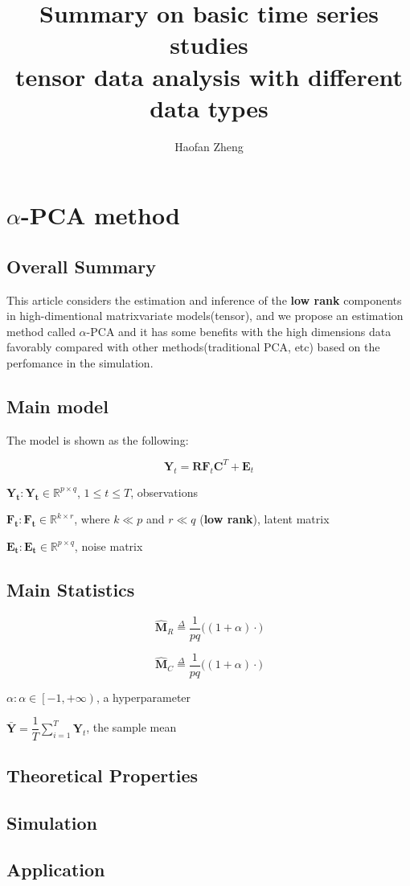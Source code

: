 \documentclass{article}[12pt]
\title{\textbf{Summary on basic time series studies\\ \large tensor data analysis with different data types}}
\author{Haofan Zheng}
\date{}
\begin{document}
\maketitle
\newpage
\tableofcontents
\newpage

\section{$\alpha$-PCA method}
\subsection{Overall Summary}
This article considers the estimation and inference of the \textbf{low rank} components in high-dimentional matrixvariate models(tensor), and we propose an estimation method called $\alpha$-PCA and it has some benefits with the high dimensions data favorably compared with other methods(traditional PCA, etc) based on the perfomance in the simulation.



\subsection{Main model}
The model is shown as the following:

$$\mathbf{Y}_t = \mathbf{R}\mathbf{F}_t\mathbf{C}^T+\mathbf{E}_t$$

$\mathbf{Y_t}: \mathbf{Y_t}\in \mathbb{R}^{p\times q}$, $1\leq t \leq T$, observations

$\mathbf{F_t}: \mathbf{F_t}\in \mathbb{R}^{k\times r}$, where $k\ll p$ and $r\ll q$ (\textbf{low rank}), latent matrix

$\mathbf{E_t}: \mathbf{E_t}\in \mathbb{R}^{p \times q}$, noise matrix

\subsection{Main Statistics}

$$\mathbf{\hat{M}}_R  \overset{\Delta}{=} \dfrac{1}{pq}\Bigg((1+\alpha) \cdot \mathbf{}\Bigg)$$

$$\mathbf{\hat{M}}_C  \overset{\Delta}{=} \dfrac{1}{pq}\Bigg((1+\alpha) \cdot \Bigg)$$

$\alpha: \alpha \in \left[-1,+\infty \right)$, a hyperparameter 

$\mathbf{\bar{Y}}=\dfrac{1}{T} \sum\limits_{i=1}^T\mathbf{Y}_t$, the sample mean
\subsection{Theoretical Properties}
\subsection{Simulation}
\subsection{Application}
    
   
\end{document}
